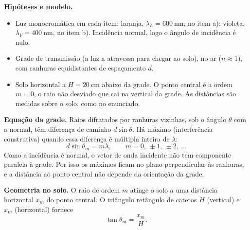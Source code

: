 \documentclass{article}%
\begin{document}
\textbf{Hipóteses e modelo.}
\begin{itemize}
  \item Luz monocromática em cada item: laranja, $\lambda_L = 600\ \text{nm}$, no item a); violeta, $\lambda_V = 400\ \text{nm}$, no item b). Incidência normal, logo o ângulo de incidência é nulo.
  \item Grade de transmissão (a luz a atravessa para chegar ao solo), no ar ($n \approx 1$), com ranhuras equidistantes de espaçamento $d$.
  \item Solo horizontal a $H = 20\ \text{cm}$ abaixo da grade. O ponto central é a ordem $m = 0$, o raio não desviado que cai na vertical da grade. As distâncias são medidas sobre o solo, como no enunciado.
\end{itemize}

\textbf{Equação da grade.} Raios difratados por ranhuras vizinhas, sob o ângulo $\theta$ com a normal, têm diferença de caminho $d\sin\theta$. Há máximo (interferência construtiva) quando essa diferença é múltipla inteira de $\lambda$:
\[
d\sin\theta_m = m\lambda, \qquad m = 0,\ \pm 1,\ \pm 2,\ \dots
\]
Como a incidência é normal, o vetor de onda incidente não tem componente paralela à grade. Por isso os máximos ficam no plano perpendicular às ranhuras, e a distância ao ponto central não depende da orientação da grade.

\textbf{Geometria no solo.} O raio de ordem $m$ atinge o solo a uma distância horizontal $x_m$ do ponto central. O triângulo retângulo de catetos $H$ (vertical) e $x_m$ (horizontal) fornece
\[
\tan\theta_m = \frac{x_m}{H}.
\]

\begin{center}
\end{center}
\end{document}
